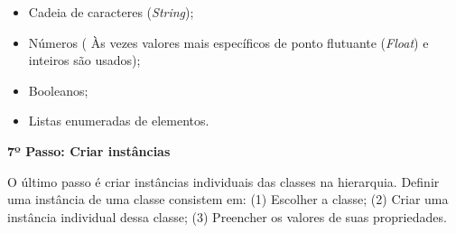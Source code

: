   \begin{itemize}
   \item Cadeia de caracteres (\textit{String});
   \item Números ( Às vezes valores mais específicos de ponto flutuante (\textit{Float}) e inteiros são usados);
   \item Booleanos;
   \item Listas enumeradas de elementos.
  \end{itemize}
  
\vspace{0.5cm}  

{\raggedright  
\textbf{7º Passo: Criar instâncias}
}

  O último passo é criar instâncias individuais das classes na hierarquia. Definir uma instância de uma classe consistem em:
  (1) Escolher a classe; 
  (2) Criar uma instância individual dessa classe; 
  (3) Preencher os valores de suas propriedades. \cite{noy15}
  